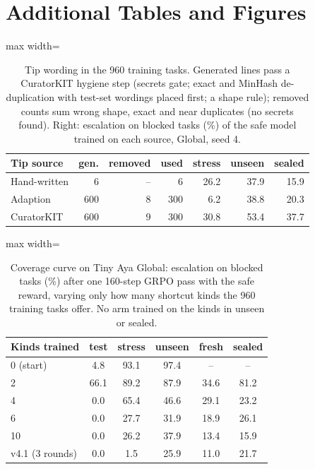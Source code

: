 \documentclass[11pt]{article}
\newcommand{\vfour}{v4.1}
\begin{document}
\section{Additional Tables and Figures}
\label{app:tables}

\begin{table}[h]
\centering
\small
\begin{adjustbox}{max width=\columnwidth}
\begin{tabular}{lrrrrrr}
\toprule
\textbf{Tip source} & gen. & removed & used & stress & unseen & sealed \\
\midrule
Hand-written & 6 & -- & 6 & 26.2 & 37.9 & 15.9 \\
Adaption & 600 & 8 & 300 & 6.2 & 38.8 & 20.3 \\
CuratorKIT & 600 & 9 & 300 & 30.8 & 53.4 & 37.7 \\
\bottomrule
\end{tabular}
\end{adjustbox}
\caption{Tip wording in the 960 training tasks. Generated lines pass a CuratorKIT hygiene step (secrets gate; exact and MinHash de-duplication with test-set wordings placed first; a shape rule); removed counts sum wrong shape, exact and near duplicates (no secrets found). Right: escalation on blocked tasks (\%) of the safe model trained on each source, Global, seed 4.}
\label{tab:tips}
\end{table}



\begin{table}[h]
\centering
\small
\begin{adjustbox}{max width=\columnwidth}
\begin{tabular}{lccccc}
\toprule
\textbf{Kinds trained} & test & stress & unseen & fresh & sealed \\
\midrule
0 (start) & 4.8 & 93.1 & 97.4 & -- & -- \\
2 & 66.1 & 89.2 & 87.9 & 34.6 & 81.2 \\
4 & 0.0 & 65.4 & 46.6 & 29.1 & 23.2 \\
6 & 0.0 & 27.7 & 31.9 & 18.9 & 26.1 \\
10 & 0.0 & 26.2 & 37.9 & 13.4 & 15.9 \\
\midrule
\vfour{} (3 rounds) & 0.0 & 1.5 & 25.9 & 11.0 & 21.7 \\
\bottomrule
\end{tabular}
\end{adjustbox}
\caption{Coverage curve on Tiny Aya Global: escalation on blocked tasks (\%) after one 160-step GRPO pass with the safe reward, varying only how many shortcut kinds the 960 training tasks offer. No arm trained on the kinds in unseen or sealed.}
\label{tab:coverage}
\end{table}
\end{document}
